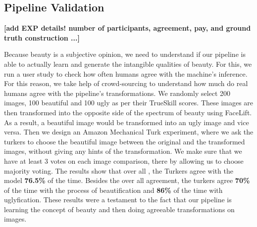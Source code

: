 \subsection{Pipeline Validation}
\textbf{[add EXP details! number of participants, agreement, pay, and ground truth construction ...]}

Because beauty is a subjective opinion, we need to understand if our pipeline is able to actually learn and generate the intangible qualities of beauty. For this, we run a user study to check how often humans agree with the machine's inference. For this reason, we take help of crowd-sourcing to understand how much do real humans agree with the pipeline's transformations.
We randomly select 200 images, 100 beautiful  and 100 ugly as per their TrueSkill scores. These images are then transformed into the opposite side of the spectrum of beauty using FaceLift. As a result, a beautiful image would be transformed into an ugly image and vice versa. Then we design an Amazon Mechanical Turk experiment, where we ask the turkers to choose the beautiful image between the original and the transformed images, without giving any hints of the transformation. We make sure that we have at least 3 votes on each image comparison, there by allowing us to choose majority voting. The results show that over all , the Turkers agree with the model \textbf{76.5\%} of the time. Besides the over all agreement, the turkers agree \textbf{70\%} of the time with the process of beautification and \textbf{86\%} of the time with uglyfication. These results were a testament to the fact that our pipeline is learning the concept of beauty and then doing agreeable transformations on images.  